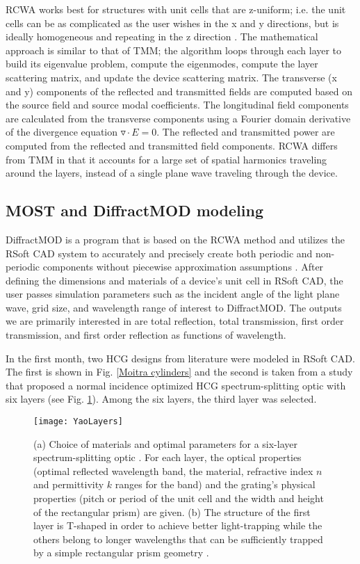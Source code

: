 \documentclass{article}
\begin{document}
RCWA works best for structures with unit cells that are z-uniform; i.e. the unit cells can be as complicated as the user wishes in the x and y directions, but is ideally homogeneous and repeating in the z direction \cite{RCWAImplementationLecture}. The mathematical approach is similar to that of TMM; the algorithm loops through each layer to build its eigenvalue problem, compute the eigenmodes, compute the layer scattering matrix, and update the device scattering matrix. The transverse (x and y) components of the reflected and transmitted fields are computed based on the source field and source modal coefficients. The longitudinal field components are calculated from the transverse components using a Fourier domain derivative of the divergence equation $\triangledown \cdot E = 0$. The reflected and transmitted power are computed from the reflected and transmitted field components. RCWA differs from TMM in that it accounts for a large set of spatial harmonics traveling around the layers, instead of a single plane wave traveling through the device\cite{RCWAImplementationLecture}.  

\subsection*{MOST and DiffractMOD modeling}
DiffractMOD is a program that is based on the RCWA method and utilizes the RSoft CAD system to accurately and precisely create both periodic and non-periodic components without piecewise approximation assumptions \cite{DiffractMOD}. After defining the dimensions and materials of a device's unit cell in RSoft CAD, the user passes simulation parameters such as the incident angle of the light plane wave, grid size, and wavelength range of interest to DiffractMOD. The outputs we are primarily interested in are total reflection, total transmission, first order transmission, and first order reflection as functions of wavelength. 

In the first month, two HCG designs from literature \cite{Moitra1} \cite{Yao} were modeled in RSoft CAD. The first is shown in Fig. \ref{Moitra cylinders} and the second is taken from a study that proposed a normal incidence optimized HCG spectrum-splitting optic with six layers (see Fig. \ref{YaoLayers}). Among the six layers, the third layer was selected. 

\begin{figure}[h]
	\centering
	\texttt{[image: YaoLayers]}
	\caption{(a) Choice of materials and optimal parameters for a six-layer spectrum-splitting optic \cite{Yao}. For each layer, the optical properties (optimal reflected wavelength band, the material, refractive index $n$ and permittivity $k$ ranges for the band) and the grating's physical properties (pitch or period of the unit cell and the width and height of the rectangular prism) are given. (b) The structure of the first layer is T-shaped in order to achieve better light-trapping while the others belong to longer wavelengths that can be sufficiently trapped by a simple rectangular prism geometry \cite{Yao}.}
	\label{YaoLayers}
\end{figure}
\end{document}

